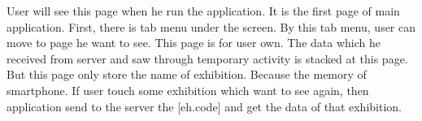 \documentclass[conference]{IEEEtran}
\begin{document}
\quad User will see this page when he run the application. It is the first page of main application. First, there is tab menu under the screen. By this tab menu, user can move to page he want to see.  This page is for user own. The data which he received from server and saw through temporary activity is stacked at this page. But this page only store the name of exhibition. Because the memory of smartphone. If user touch some exhibition which want to see again, then application send to the server the [eh.code] and get the data of that exhibition.\\\\\\\\\\\\\\\
\end{document}
